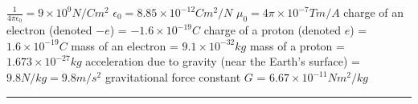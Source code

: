 \documentclass[10pt,landscape]{article}
\begin{document}
\begin{multicols}{3}
$\frac{1}{4\pi\epsilon_0} = 9\times 10^9 N/Cm^2$ \newline
$\epsilon_0 = 8.85\times 10^{-12} {Cm^2/N}$ \newline
$\mu_0 = 4\pi\times 10^{-7} Tm/A$
charge of an electron (denoted $-e$) = $-1.6\times 10^{-19} C$\newline
charge of a proton (denoted $e$) = $1.6\times 10^{-19} C$\newline
mass of an electron = $9.1\times 10^{-32} kg$ \newline
mass of a proton = $1.673\times 10^{-27} kg$ \newline
acceleration due to gravity (near the Earth's surface) = $9.8 N/kg = 9.8 m/s^2$ \newline
gravitational force constant $G$ = $6.67\times 10^{-11} Nm^2/kg$

\rule{0.3\linewidth}{0.25pt}
\scriptsize


\end{multicols}
\end{document}
